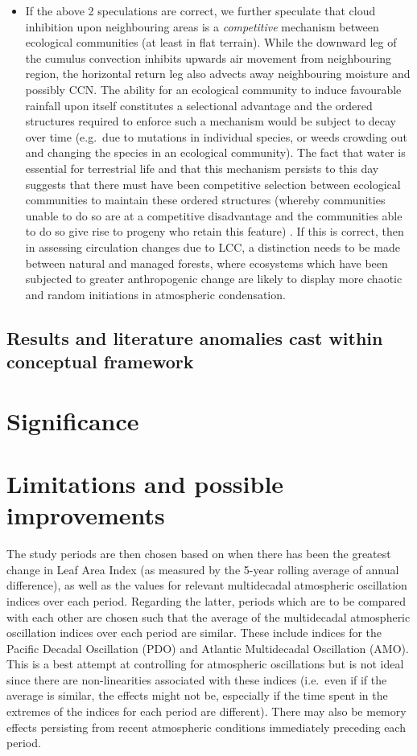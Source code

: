 \begin{itemize}
	\item If the above 2 speculations are correct, we further speculate that cloud inhibition upon neighbouring areas is a \textit{competitive} mechanism between ecological communities (at least in flat terrain). While the downward leg of the cumulus convection inhibits upwards air movement from neighbouring region, the horizontal return leg also advects away neighbouring moisture and possibly \ac{CCN}. The ability for an ecological community to induce favourable rainfall upon itself constitutes a selectional advantage and the ordered structures required to enforce such a mechanism would be subject to decay over time (e.g.\ due to mutations in individual species, or weeds crowding out and changing the species in an ecological community). The fact that water is essential for terrestrial life and that this mechanism persists to this day suggests that there must have been competitive selection between ecological communities to maintain these ordered structures (whereby communities unable to do so are at a competitive disadvantage and the communities able to do so give rise to progeny who retain this feature) \citep{gorshkov2000}. If this is correct, then in assessing circulation changes due to \ac{LCC}, a distinction needs to be made between natural and managed forests, where ecosystems which have been subjected to greater anthropogenic change are likely to display more chaotic and random initiations in atmospheric condensation.
\end{itemize}

\subsection{Results and literature anomalies cast within conceptual framework}
\label{ssec:model_explain}

\section{Significance}

\section{Limitations and possible improvements}

The study periods are then chosen based on when there has been the greatest change in Leaf Area Index (as measured by the 5-year rolling average of annual difference), as well as the values for relevant multidecadal atmospheric oscillation indices over each period. Regarding the latter, periods which are to be compared with each other are chosen such that the average of the multidecadal atmospheric oscillation indices over each period are similar. These include indices for the Pacific Decadal Oscillation (PDO) and Atlantic Multidecadal Oscillation (AMO). This is a best attempt at controlling for atmospheric oscillations but is not ideal since there are non-linearities associated with these indices (i.e.\ even if if the average is similar, the effects might not be, especially if the time spent in the extremes of the indices for each period are different). There may also be memory effects persisting from recent atmospheric conditions immediately preceding each period.

